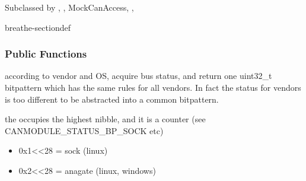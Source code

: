 \documentclass[a4paper,10pt,english]{sphinxmanual}
\begin{document}
\begin{fulllineitems}
%
\pysigstartmultiline
{}%
\pysigstopmultiline
\sphinxAtStartPar
Subclassed by {\hyperref[\detokenize{classestracing:classAnaCanScan}]{}}, {\hyperref[\detokenize{vendors/systec:classCSockCanScan}]{}}, MockCanAccess, {\hyperref[\detokenize{vendors/peak:classPKCanScan}]{}}, {\hyperref[\detokenize{classestracing:classSTCanScan}]{}}

\begin{sphinxuseclass}{breathe-sectiondef}\subsubsection*{Public Functions}

\begin{fulllineitems}
\label{\detokenize{canports:_CPPv4N9CanModule10CCanAccess13getPortStatusEv}}%
\pysigstartmultiline
{}%
\pysigstopmultiline
\sphinxAtStartPar
according to vendor and OS, acquire bus status, and return one uint32\_t bitpattern which has the same rules for all vendors. In fact the status for vendors is too different to be abstracted into a common bitpattern.

\sphinxAtStartPar
the  occupies the highest nibble, and it is a counter (see CANMODULE\_STATUS\_BP\_SOCK etc)\begin{itemize}
\item {} 
\sphinxAtStartPar
0x1\textless{}\textless{}28 = sock (linux)

\item {} 
\sphinxAtStartPar
0x2\textless{}\textless{}28 = anagate (linux, windows)


\end{itemize}
\end{fulllineitems}
\end{sphinxuseclass}
\end{fulllineitems}
\end{document}
